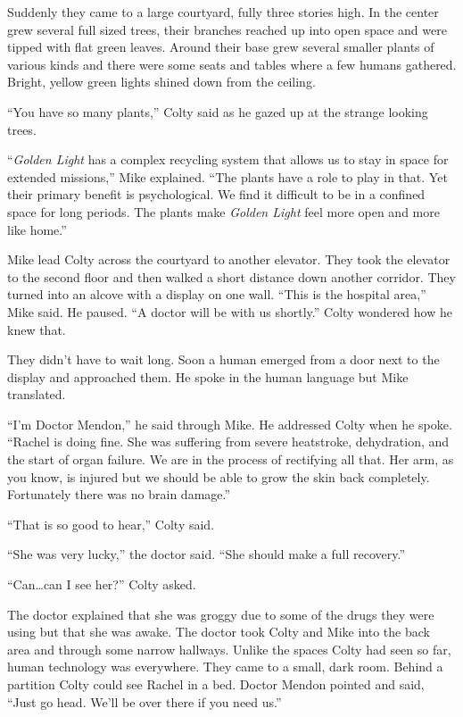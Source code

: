 Suddenly they came to a large courtyard, fully three stories high. In the center grew several
full sized trees, their branches reached up into open space and were tipped with flat green
leaves. Around their base grew several smaller plants of various kinds and there were some seats
and tables where a few humans gathered. Bright, yellow green lights shined down from the
ceiling.


``You have so many plants,'' Colty said as he gazed up at the strange looking trees.

``\textit{Golden Light} has a complex recycling system that allows us to stay in space for
extended missions,'' Mike explained. ``The plants have a role to play in that. Yet their primary
benefit is psychological. We find it difficult to be in a confined space for long periods. The
plants make \textit{Golden Light} feel more open and more like home.''

Mike lead Colty across the courtyard to another elevator. They took the elevator to the second
floor and then walked a short distance down another corridor. They turned into an alcove with a
display on one wall. ``This is the hospital area,'' Mike said. He paused. ``A doctor will be
with us shortly.'' Colty wondered how he knew that.

They didn't have to wait long. Soon a human emerged from a door next to the display and
approached them. He spoke in the human language but Mike translated.

``I'm Doctor Mendon,'' he said through Mike. He addressed Colty when he spoke. ``Rachel is doing
fine. She was suffering from severe heatstroke, dehydration, and the start of organ failure. We
are in the process of rectifying all that. Her arm, as you know, is injured but we should be
able to grow the skin back completely. Fortunately there was no brain damage.''

``That is so good to hear,'' Colty said.

``She was very lucky,'' the doctor said. ``She should make a full recovery.''

``Can\ldots can I see her?'' Colty asked.

The doctor explained that she was groggy due to some of the drugs they were using but that she
was awake. The doctor took Colty and Mike into the back area and through some narrow hallways.
Unlike the spaces Colty had seen so far, human technology was everywhere. They came to a small,
dark room. Behind a partition Colty could see Rachel in a bed. Doctor Mendon pointed and said,
``Just go head. We'll be over there if you need us.''

